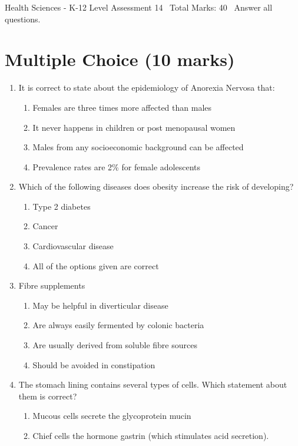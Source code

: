 \documentclass[12pt]{article}
\begin{document}
\begin{center}
Health Sciences - K-12 Level Assessment 14 \
Total Marks: 40 \
Answer all questions.
\end{center}

\section*{Multiple Choice (10 marks)}
\begin{enumerate}[label=\arabic*.]
\item It is correct to state about the epidemiology of Anorexia Nervosa that:
\begin{enumerate}[label=(\alph*)]
    \item Females are three times more affected than males
    \item It never happens in children or post menopausal women
    \item Males from any socioeconomic background can be affected
    \item Prevalence rates are 2\% for female adolescents
\end{enumerate}
\item Which of the following diseases does obesity increase the risk of developing?
\begin{enumerate}[label=(\alph*)]
    \item Type 2 diabetes
    \item Cancer
    \item Cardiovascular disease
    \item All of the options given are correct
\end{enumerate}
\item Fibre supplements
\begin{enumerate}[label=(\alph*)]
    \item May be helpful in diverticular disease
    \item Are always easily fermented by colonic bacteria
    \item Are usually derived from soluble fibre sources
    \item Should be avoided in constipation
\end{enumerate}
\item The stomach lining contains several types of cells. Which statement about them is correct?
\begin{enumerate}[label=(\alph*)]
    \item Mucous cells secrete the glycoprotein mucin
    \item Chief cells the hormone gastrin (which stimulates acid secretion).

\end{enumerate}
\end{enumerate}
\end{document}
